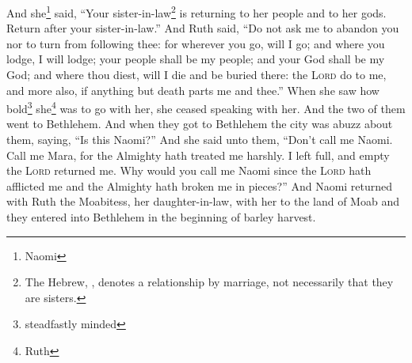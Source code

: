 \begin{enumerate*}[mode=unboxed]
     And she\footnote{Naomi} said, ``Your sister-in-law\footnote{The Hebrew, , denotes a relationship by marriage, not necessarily that they are sisters.} is returning to her people and to her gods. Return after your sister-in-law.''%
     And Ruth said, ``Do not ask me to abandon you nor to turn from following thee: for wherever you go, will I go; and where you lodge, I will lodge; your people shall be my people; and your God shall be my God;%
     and where thou diest, will I die and be buried there: the \textsc{Lord} do to me, and more also, if anything but death parts me and thee.''%
     When she saw how bold\footnote{steadfastly minded} she\footnote{Ruth} was to go with her, she ceased speaking with her.%
     And the two of them went to Bethlehem. And when they got to Bethlehem the city was abuzz about them, saying, ``Is this Naomi?''%
     And she said unto them, ``Don't call me Naomi. Call me Mara, for the Almighty hath treated me harshly.%
     I left full, and empty the \textsc{Lord} returned me. Why would you call me Naomi since the \textsc{Lord} hath afflicted me and the Almighty hath broken me in pieces?''%
     And Naomi returned with Ruth the Moabitess, her daughter-in-law, with her to the land of Moab and they entered into Bethlehem in the beginning of barley harvest.%
\end{enumerate*}
